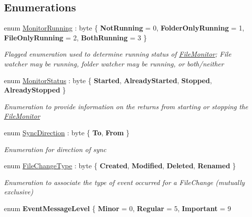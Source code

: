 \subsection*{Enumerations}
\begin{DoxyCompactItemize}
\item 
enum \hyperlink{namespace_cloud_api_public_1_1_static_a502726756c6bc84b5c9bcaf23c3a8d28}{Monitor\-Running} \-: byte \{ {\bfseries Not\-Running} = 0, 
{\bfseries Folder\-Only\-Running} = 1, 
{\bfseries File\-Only\-Running} = 2, 
{\bfseries Both\-Running} = 3
 \}
\begin{DoxyCompactList}\small\item\em Flagged enumeration used to determine running status of \hyperlink{namespace_file_monitor}{File\-Monitor}; File watcher may be running, folder watcher may be running, or both/neither \end{DoxyCompactList}\item 
enum \hyperlink{namespace_cloud_api_public_1_1_static_a31db95951688473984962a22ad05a45f}{Monitor\-Status} \-: byte \{ {\bfseries Started}, 
{\bfseries Already\-Started}, 
{\bfseries Stopped}, 
{\bfseries Already\-Stopped}
 \}
\begin{DoxyCompactList}\small\item\em Enumeration to provide information on the returns from starting or stopping the \hyperlink{namespace_file_monitor}{File\-Monitor} \end{DoxyCompactList}\item 
enum \hyperlink{namespace_cloud_api_public_1_1_static_a8ba5d1f6d06fa058730616f021c8974f}{Sync\-Direction} \-: byte \{ {\bfseries To}, 
{\bfseries From}
 \}
\begin{DoxyCompactList}\small\item\em Enumeration for direction of sync \end{DoxyCompactList}\item 
enum \hyperlink{namespace_cloud_api_public_1_1_static_a08ff1fddb1dc38f7b861b0fd106834be}{File\-Change\-Type} \-: byte \{ {\bfseries Created}, 
{\bfseries Modified}, 
{\bfseries Deleted}, 
{\bfseries Renamed}
 \}
\begin{DoxyCompactList}\small\item\em Enumeration to associate the type of event occurred for a File\-Change (mutually exclusive) \end{DoxyCompactList}\item 
enum {\bfseries Event\-Message\-Level} \{ {\bfseries Minor} = 0, 
{\bfseries Regular} = 5, 
{\bfseries Important} = 9

\end{DoxyCompactItemize}
